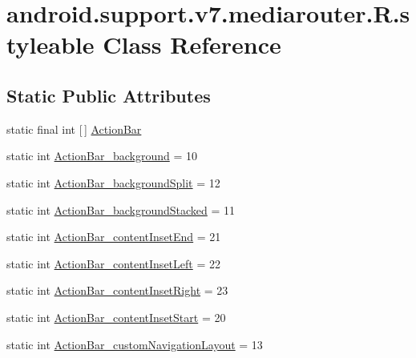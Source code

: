 \hypertarget{classandroid_1_1support_1_1v7_1_1mediarouter_1_1R_1_1styleable}{}\section{android.\+support.\+v7.\+mediarouter.\+R.\+styleable Class Reference}
\label{classandroid_1_1support_1_1v7_1_1mediarouter_1_1R_1_1styleable}
\subsection*{Static Public Attributes}
\begin{DoxyCompactItemize}
\item 
static final int \mbox{[}$\,$\mbox{]} \hyperlink{classandroid_1_1support_1_1v7_1_1mediarouter_1_1R_1_1styleable_adc4d3c0d096085367f12d025007aa53f}{Action\+Bar}
\item 
static int \hyperlink{classandroid_1_1support_1_1v7_1_1mediarouter_1_1R_1_1styleable_a84d5481885cf2060ab501c5dd03f0fd2}{Action\+Bar\+\_\+background} = 10
\item 
static int \hyperlink{classandroid_1_1support_1_1v7_1_1mediarouter_1_1R_1_1styleable_ab203bd1cd9b9493b6f496c4fb5593e92}{Action\+Bar\+\_\+background\+Split} = 12
\item 
static int \hyperlink{classandroid_1_1support_1_1v7_1_1mediarouter_1_1R_1_1styleable_ac5c86fa90bff4275662ebc51c94cbda2}{Action\+Bar\+\_\+background\+Stacked} = 11
\item 
static int \hyperlink{classandroid_1_1support_1_1v7_1_1mediarouter_1_1R_1_1styleable_ae206c7fabfc44981bb04d4020240e52a}{Action\+Bar\+\_\+content\+Inset\+End} = 21
\item 
static int \hyperlink{classandroid_1_1support_1_1v7_1_1mediarouter_1_1R_1_1styleable_a0fae6030af51792fafa6f48d490a69a4}{Action\+Bar\+\_\+content\+Inset\+Left} = 22
\item 
static int \hyperlink{classandroid_1_1support_1_1v7_1_1mediarouter_1_1R_1_1styleable_a015913d4c4cc4f35f6b5377bf926d3c7}{Action\+Bar\+\_\+content\+Inset\+Right} = 23
\item 
static int \hyperlink{classandroid_1_1support_1_1v7_1_1mediarouter_1_1R_1_1styleable_a16470c607bc14ed7d7bba8a623075442}{Action\+Bar\+\_\+content\+Inset\+Start} = 20
\item 
static int \hyperlink{classandroid_1_1support_1_1v7_1_1mediarouter_1_1R_1_1styleable_a5c3f8aaa133e06d0779223802c38aa49}{Action\+Bar\+\_\+custom\+Navigation\+Layout} = 13

\end{DoxyCompactItemize}
